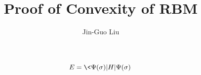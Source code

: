 \documentclass[prb,twocolumn,superscriptaddress]{revtex4-1}
\begin{document}
\title{Proof of Convexity of RBM}

\author{Jin-Guo Liu}
\affiliation{}


%

\maketitle

\begin{equation}
    E=\<\Psi(\sigma)|H|\Psi(\sigma)\>
    
\end{equation}
\end{document}

